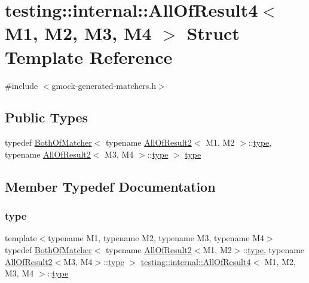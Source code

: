 \hypertarget{structtesting_1_1internal_1_1_all_of_result4}{}\section{testing\+:\+:internal\+:\+:All\+Of\+Result4$<$ M1, M2, M3, M4 $>$ Struct Template Reference}
\label{structtesting_1_1internal_1_1_all_of_result4}


{\ttfamily \#include $<$gmock-\/generated-\/matchers.\+h$>$}

\subsection*{Public Types}
\begin{DoxyCompactItemize}
\item 
typedef \hyperlink{classtesting_1_1internal_1_1_both_of_matcher}{Both\+Of\+Matcher}$<$ typename \hyperlink{structtesting_1_1internal_1_1_all_of_result2}{All\+Of\+Result2}$<$ M1, M2 $>$\+::\hyperlink{structtesting_1_1internal_1_1_all_of_result4_ab277e20178bac632d4e5a39a1a407bbf}{type}, typename \hyperlink{structtesting_1_1internal_1_1_all_of_result2}{All\+Of\+Result2}$<$ M3, M4 $>$\+::\hyperlink{structtesting_1_1internal_1_1_all_of_result4_ab277e20178bac632d4e5a39a1a407bbf}{type} $>$ \hyperlink{structtesting_1_1internal_1_1_all_of_result4_ab277e20178bac632d4e5a39a1a407bbf}{type}
\end{DoxyCompactItemize}


\subsection{Member Typedef Documentation}
\mbox{\label{structtesting_1_1internal_1_1_all_of_result4_ab277e20178bac632d4e5a39a1a407bbf}} 
\subsubsection{\texorpdfstring{type}{type}}
{\footnotesize\ttfamily template$<$typename M1, typename M2, typename M3, typename M4$>$ \\
typedef \hyperlink{classtesting_1_1internal_1_1_both_of_matcher}{Both\+Of\+Matcher}$<$ typename \hyperlink{structtesting_1_1internal_1_1_all_of_result2}{All\+Of\+Result2}$<$M1, M2$>$\+::\hyperlink{structtesting_1_1internal_1_1_all_of_result4_ab277e20178bac632d4e5a39a1a407bbf}{type}, typename \hyperlink{structtesting_1_1internal_1_1_all_of_result2}{All\+Of\+Result2}$<$M3, M4$>$\+::\hyperlink{structtesting_1_1internal_1_1_all_of_result4_ab277e20178bac632d4e5a39a1a407bbf}{type} $>$ \hyperlink{structtesting_1_1internal_1_1_all_of_result4}{testing\+::internal\+::\+All\+Of\+Result4}$<$ M1, M2, M3, M4 $>$\+::\hyperlink{structtesting_1_1internal_1_1_all_of_result4_ab277e20178bac632d4e5a39a1a407bbf}{type}}



